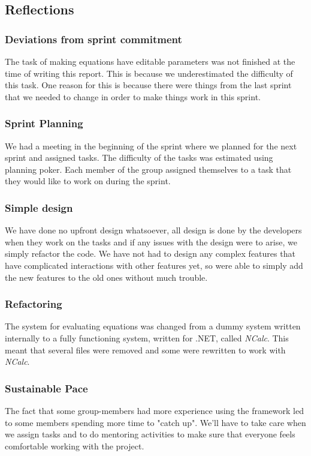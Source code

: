 \documentclass[14]{article}
\begin{document}
\subsection{Reflections}

\subsubsection{Deviations from sprint commitment}
The task of making equations have editable parameters was not finished at the time of writing this report. This is because we underestimated the difficulty of this task. One reason for this is because there were things from the last sprint that we needed to change in order to make things work in this sprint. 



\subsubsection{Sprint Planning}
We had a meeting in the beginning of the sprint where we planned for the next sprint and assigned tasks. The difficulty of the tasks was estimated using planning poker. Each member of the group assigned themselves to a task that they would like to work on during the sprint.

\subsubsection{Simple design}
We have done no upfront design whatsoever, all design is done by the developers when they work on the tasks and if any issues with the design were to arise, we simply refactor the code. We have not had to design any complex features that have complicated interactions with other features yet, so were able to simply add the new features to the old ones without much trouble. 

\subsubsection{Refactoring}
The system for evaluating equations was changed from a dummy system written internally to a fully functioning system, written for .NET, called \textit{NCalc}.
This meant that several files were removed and some were rewritten to work with \textit{NCalc}.

\subsubsection{Sustainable Pace}
The fact that some group-members had more experience using the framework led to some members spending more time to "catch up". We'll have to take care when we assign tasks and to do mentoring activities to make sure that everyone feels comfortable working with the project. 
\end{document}

